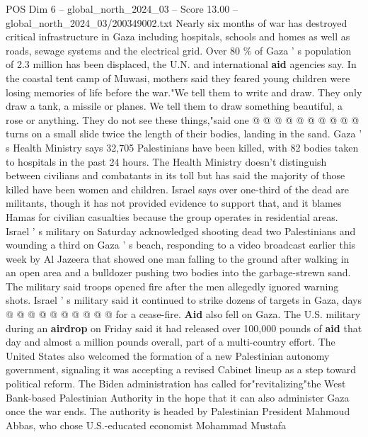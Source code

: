 \begin{textsample}{POS Dim 6 – global\_north\_2024\_03 – Score 13.00 – global\_north\_2024\_03/200349002.txt}
Nearly six months of war has destroyed critical infrastructure in Gaza including hospitals, schools and homes as well as roads, sewage systems and the electrical grid.
Over 80 \% of Gaza ' s population of 2.3 million has been displaced, the U.N. and international \textbf{aid} agencies say.
In the coastal tent camp of Muwasi, mothers said they feared young children were losing memories of life before the war."We tell them to write and draw.
They only draw a tank, a missile or planes.
We tell them to draw something beautiful, a rose or anything.
They do not see these things,"said one @ @ @ @ @ @ @ @ @ @ turns on a small slide twice the length of their bodies, landing in the sand.
Gaza ' s Health Ministry says 32,705 Palestinians have been killed, with 82 bodies taken to hospitals in the past 24 hours.
The Health Ministry doesn't distinguish between civilians and combatants in its toll but has said the majority of those killed have been women and children.
Israel says over one-third of the dead are militants, though it has not provided evidence to support that, and it blames Hamas for civilian casualties because the group operates in residential areas.
Israel ' s military on Saturday acknowledged shooting dead two Palestinians and wounding a third on Gaza ' s beach, responding to a video broadcast earlier this week by Al Jazeera that showed one man falling to the ground after walking in an open area and a bulldozer pushing two bodies into the garbage-strewn sand.
The military said troops opened fire after the men allegedly ignored warning shots.
Israel ' s military said it continued to strike dozens of targets in Gaza, days @ @ @ @ @ @ @ @ @ @ for a cease-fire. \textbf{Aid} also fell on Gaza.
The U.S. military during an \textbf{airdrop} on Friday said it had released over 100,000 pounds of \textbf{aid} that day and almost a million pounds overall, part of a multi-country effort.
The United States also welcomed the formation of a new Palestinian autonomy government, signaling it was accepting a revised Cabinet lineup as a step toward political reform.
The Biden administration has called for"revitalizing"the West Bank-based Palestinian Authority in the hope that it can also administer Gaza once the war ends.
The authority is headed by Palestinian President Mahmoud Abbas, who chose U.S.-educated economist Mohammad Mustafa

\end{textsample}
